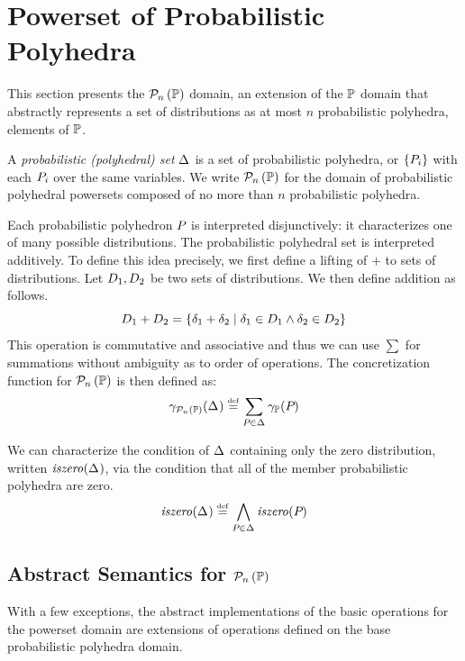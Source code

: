 \section{Powerset of Probabilistic Polyhedra}
\label{sec:probset}

This section presents the $ \mathcal{P}_{n}\left( \mathbb{P} \right) $ domain, an extension of the $ \mathbb{P}
$ domain 
that abstractly represents a set of distributions as at most $ n $
probabilistic polyhedra, elements of $ \mathbb{P} $.

\begin{definition} A \emph{probabilistic (polyhedral) set} $
  \Delta_{} $ is a set of probabilistic polyhedra, or  $ \left\{ P_{i} \right\} $
  with each $ P_{i} $ over the same variables. We write $
  \mathcal{P}_{n}\left( \mathbb{P} \right) $ for the domain of probabilistic polyhedral powersets
  composed of no more than $ n $ probabilistic polyhedra.

Each probabilistic polyhedron $P_{}$ is interpreted disjunctively: it
characterizes one of many possible distributions.  The probabilistic
polyhedral set is interpreted additively.  To define this idea
precisely, we first define a lifting of $+$ to sets of distributions.  Let $D_{1}, D_{2}$ be two sets of distributions.  We then define addition as follows.
\[D_{1} + D_{2} = \{\delta_1 + \delta_2 \mid \delta_1 \in D_{1} \wedge \delta_2 \in D_{2}\}\]
This operation is commutative and associative and thus we can use $\sum$ for summations without ambiguity as to order of operations.
The concretization function for $\mathcal{P}_{n}\left( \mathbb{P} \right)$ is then defined as:
$$ \gamma_{\mathcal{P}_{n}\left( \mathbb{P} \right)}(\Delta_{}) \stackrel{\smash{\scriptscriptstyle \mathrm{def}}}= \sum_{P_{} \in \Delta_{}} \gamma_{\mathbb{P}}(P_{}) $$
\end{definition}

We can characterize the condition of $ \Delta_{} $ containing only the
zero distribution, written $ \mathit{iszero}(\Delta_{}) $, via the condition that
all of the member probabilistic polyhedra are zero.
$$ \mathit{iszero}(\Delta_{}) \stackrel{\smash{\scriptscriptstyle \mathrm{def}}}= \bigwedge_{P_{} \in \Delta_{}} \mathit{iszero}(P_{}) $$


\subsection{Abstract Semantics for $\mathcal{P}_{n}\left( \mathbb{P} \right)$}

With a few exceptions, the abstract implementations of the basic
operations for the powerset domain are extensions of operations
defined on the base probabilistic polyhedra domain.

